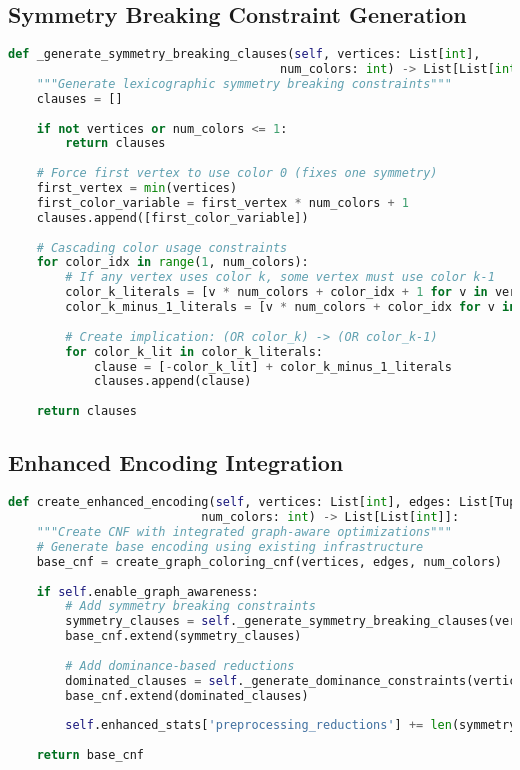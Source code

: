 \subsection{Symmetry Breaking Constraint Generation}
\label{appendix:symmetry-breaking}

\begin{lstlisting}[language=Python, caption=Symmetry Breaking Constraint Generation]
def _generate_symmetry_breaking_clauses(self, vertices: List[int], 
                                      num_colors: int) -> List[List[int]]:
    """Generate lexicographic symmetry breaking constraints"""
    clauses = []
    
    if not vertices or num_colors <= 1:
        return clauses
    
    # Force first vertex to use color 0 (fixes one symmetry)
    first_vertex = min(vertices)
    first_color_variable = first_vertex * num_colors + 1
    clauses.append([first_color_variable])
    
    # Cascading color usage constraints
    for color_idx in range(1, num_colors):
        # If any vertex uses color k, some vertex must use color k-1
        color_k_literals = [v * num_colors + color_idx + 1 for v in vertices]
        color_k_minus_1_literals = [v * num_colors + color_idx for v in vertices]
        
        # Create implication: (OR color_k) -> (OR color_k-1)
        for color_k_lit in color_k_literals:
            clause = [-color_k_lit] + color_k_minus_1_literals
            clauses.append(clause)
    
    return clauses
\end{lstlisting}

\subsection{Enhanced Encoding Integration}
\label{appendix:encoding-integration}

\begin{lstlisting}[language=Python, caption=Enhanced Encoding Integration]
def create_enhanced_encoding(self, vertices: List[int], edges: List[Tuple[int, int]], 
                           num_colors: int) -> List[List[int]]:
    """Create CNF with integrated graph-aware optimizations"""
    # Generate base encoding using existing infrastructure
    base_cnf = create_graph_coloring_cnf(vertices, edges, num_colors)
    
    if self.enable_graph_awareness:
        # Add symmetry breaking constraints
        symmetry_clauses = self._generate_symmetry_breaking_clauses(vertices, num_colors)
        base_cnf.extend(symmetry_clauses)
        
        # Add dominance-based reductions
        dominated_clauses = self._generate_dominance_constraints(vertices, edges, num_colors)
        base_cnf.extend(dominated_clauses)
        
        self.enhanced_stats['preprocessing_reductions'] += len(symmetry_clauses) + len(dominated_clauses)
    
    return base_cnf
\end{lstlisting}

